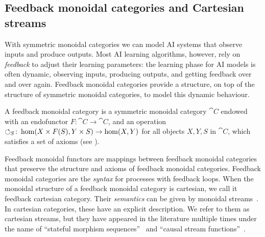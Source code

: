 \subsection{Feedback monoidal categories and Cartesian streams}
With symmetric monoidal categories we can model AI systems that observe inputs and produce outputs.
Most AI learning algorithms, however, rely on \emph{feedback} to adjust their learning parameters: the learning phase for AI models is often dynamic, observing inputs, producing outputs, and getting feedback over and over again. 
Feedback monoidal categories provide a structure, on top of the structure of symmetric monoidal categories, to model this dynamic behaviour.

\begin{definition}
A feedback monoidal category is a symmetric monoidal category \(\cat{C}\) endowed with an endofunctor $F:\cat{C} \rightarrow \cat{C}$, and an operation \(\fbk[S] \colon \hom (X \times F(S), Y \times S) \to \hom (X,Y)\) for all objects \(X,Y,S\) in \(\cat{C}\), which satisfies a set of axioms (see ).
\end{definition}
Feedback monoidal functors are mappings between feedback monoidal categories that preserve the structure and axioms of feedback monoidal categories.
Feedback monoidal categories are the \emph{syntax} for processes with feedback loops.
When the monoidal structure of a feedback monoidal category is cartesian, we call it feedback cartesian category.
Their \emph{semantics} can be given by monoidal streams~\cite{monoidalStreams}.
In cartesian categories, these have an explicit description.
We refer to them as cartesian streams, but they have appeared in the literature multiple times under the name of ``stateful morphism sequences''~\cite{katsumata19} and ``causal stream functions''~\cite{uustalu05}.

